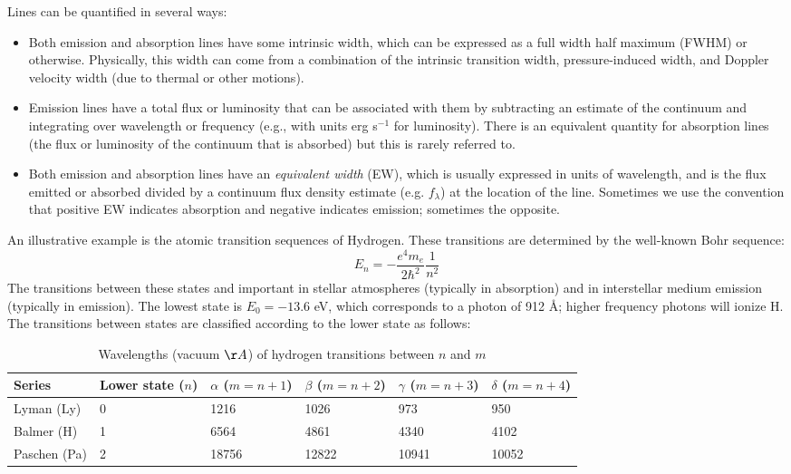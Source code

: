 Lines can be quantified in several ways:
\begin{itemize}
\item Both emission and absorption lines have some intrinsic width, which can
be expressed as a full width half maximum (FWHM) or
otherwise. Physically, this width can come from a combination of the
intrinsic transition width, pressure-induced width, and Doppler
velocity width (due to thermal or other motions).
\item Emission lines have a total flux or luminosity that can be associated
with them by subtracting an estimate of the continuum and integrating
over wavelength or frequency (e.g., with units erg s$^{-1}$ for
luminosity). There is an equivalent quantity for absorption lines (the
flux or luminosity of the continuum that is absorbed) but this is
rarely referred to.
\item Both emission and absorption lines  have an {\it equivalent
width} (EW), which is usually expressed in units of wavelength, and is
the flux emitted or absorbed divided by a continuum flux density
estimate (e.g. $f_\lambda$) at the location of the line. Sometimes we
use the convention that positive EW indicates absorption and negative
indicates emission; sometimes the opposite.
\end{itemize}

An illustrative example is the atomic transition sequences of
Hydrogen. These transitions are determined by the well-known Bohr
sequence:
\begin{equation}
E_n = - \frac{e^4m_e}{2\hbar^2} \frac{1}{n^2}
\end{equation}
The transitions between these states and important in stellar
atmospheres (typically in absorption) and in interstellar medium
emission (typically in emission). The lowest state is $E_0 = - 13.6$
eV, which corresponds to a photon of 912 \AA; higher frequency photons
will ionize H. The transitions between states are classified
according to the lower state as follows:

\begin{table}[htp]
\caption{
\label{table:hydrogen} Wavelengths (vacuum $\AA$) of hydrogen transitions between $n$ and $m$}
\begin{tabular}{llllll}
\hline\hline
Series & Lower state ($n$) & $\alpha$ ($m = n+1$) & $\beta$ ($m=n+2$)
& $\gamma$ ($m=n+3$) & $\delta$ ($m=n+4$) \\
\hline
Lyman (Ly) & 0 & 1216 & 1026	& 973	& 950 \\
Balmer (H) & 1 & 6564 & 4861	& 4340	& 4102 \\
Paschen (Pa) & 2 & 18756 & 12822	& 10941	& 10052 \\
\hline
\end{tabular}
\end{table}


